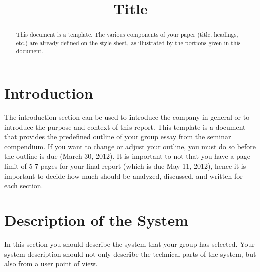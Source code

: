 \documentclass[conference]{IEEEtran}
\begin{document}
\title{Title}


\author{
\and
{}
}


\maketitle


\begin{abstract}
This document is a template. The various components of your paper (title, headings, etc.) are already defined on the style sheet, as illustrated by the portions given in this document.
\end{abstract}

\section{Introduction}
The introduction section can be used to introduce the company in general or to introduce the purpose and context of this report. This template is a document that provides the predefined outline of your group essay from the seminar compendium. If you want to change or adjust your outline, you must do so before the outline is due (March 30, 2012). It is important to not that you have a page limit of 5-7 pages for your final report (which is due May 11, 2012), hence it is important to decide how much should be analyzed, discussed, and written for each section.

\section{Description of the System}
In this section you should describe the system that your group has selected. Your system description should not only describe the technical parts of the system, but also from a user point of view. 
\end{document}
